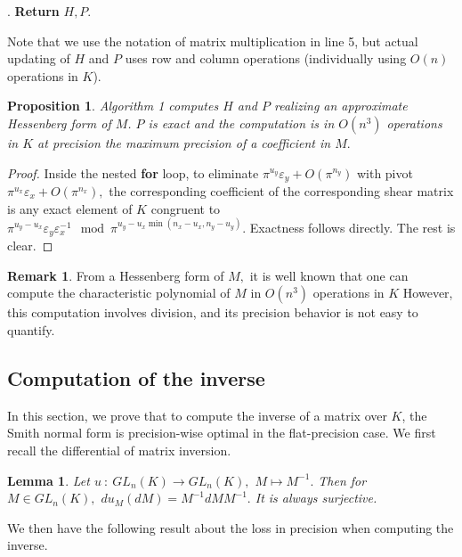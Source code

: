 \documentclass[sigconf]{acmart}
\newtheorem{lem}[theo]{Lemma}
\newtheorem{prop}[theo]{Proposition}
\theoremstyle{definition}
\newtheorem{rem}[theo]{Remark}
\begin{document}
. \textbf{Return} $H,P.$

\vspace{-1ex}\noindent\hrulefill

\medskip

Note that we use the notation of matrix multiplication in line 5, but actual updating of
$H$ and $P$ uses row and column operations (individually using $O(n)$ operations in $K$).

\begin{prop} 
Algorithm 1 computes $H$ and $P$ realizing an approximate Hessenberg form of $M$.
$P$ is exact  
and the computation is in $O(n^3)$ operations in $K$ at precision the maximum precision of a coefficient in $M.$
\end{prop}
\begin{proof}
Inside the nested \textbf{for} loop, to eliminate $\pi^{u_y} \varepsilon_y+O(\pi^{n_y})$ with pivot $\pi^{u_x} \varepsilon_x+O(\pi^{n_x}),$
the corresponding coefficient of the corresponding shear matrix is 
any exact element of $K$ congruent to 
$\pi^{u_y-u_x} \varepsilon_y \varepsilon_x^{-1} \mod \pi^{u_y-u_x\min (n_x-u_x,n_y-u_y)}$.
Exactness follows directly. 
The rest is clear.
\end{proof}

\begin{rem} \label{rem:char_pol_from_hessenberg}
From a Hessenberg form of $M,$ it is well known
that one can compute the characteristic polynomial of 
$M$ in $O(n^3)$ operations in $K$ \cite[pp. 55--56]{Cohen:2013}
However, this computation involves division, and its
precision behavior is not easy to quantify.
\end{rem}


\subsection{Computation of the inverse}

In this section, we prove that to compute the inverse of
a matrix over $K$, the Smith normal form is precision-wise optimal in the flat-precision case.
We first recall the differential of matrix inversion.

\begin{lem}
Let $u \: : \: GL_n (K) \rightarrow GL_n(K),$ $M \mapsto M^{-1}.$
Then for $M \in GL_n (K),$ $du_M(dM)=M^{-1} dM M^{-1}.$
It is always surjective.
\end{lem}

We then have the following result about the loss in precision when computing the inverse.
\end{document}
